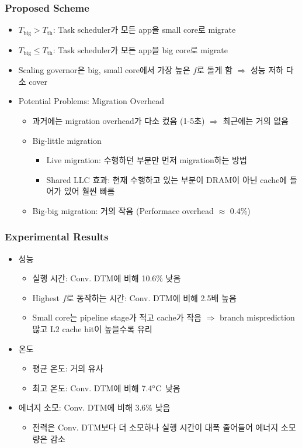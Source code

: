 \subsubsection*{Proposed Scheme}
\begin{itemize}
    \item $T_\mathrm{big}>T_\mathrm{th}$: Task scheduler가 모든 app을 small core로 migrate
    \item $T_\mathrm{big}\leq T_\mathrm{th}$: Task scheduler가 모든 app을 big core로 migrate
    \item Scaling governor은 big, small core에서 가장 높은 $f$로 돌게 함 $\Rightarrow$ 성능 저하 다소 cover
    \item Potential Problems: Migration Overhead
    \begin{itemize}
        \item 과거에는 migration overhead가 다소 컸음 (1-5초) $\Rightarrow$ 최근에는 거의 없음
        \item Big-little migration
        \begin{itemize}
            \item Live migration: 수행하던 부분만 먼저 migration하는 방법
            \item Shared LLC 효과: 현재 수행하고 있는 부분이 DRAM이 아닌 cache에 들어가 있어 훨씬 빠름
        \end{itemize}
        \item Big-big migration: 거의 작음 (Performace overhead $\approx$ 0.4\%)
    \end{itemize}
\end{itemize}

\subsubsection*{Experimental Results}
\begin{itemize}
    \item 성능
    \begin{itemize}
        \item 실행 시간: Conv. DTM에 비해 10.6\% 낮음
        \item Highest $f$로 동작하는 시간: Conv. DTM에 비해 2.5배 높음
        \item Small core는 pipeline stage가 적고 cache가 작음 $\Rightarrow$ branch misprediction 많고 L2 cache hit이 높을수록 유리
    \end{itemize}
    \newpage
    \item 온도
    \begin{itemize}
        \item 평균 온도: 거의 유사
        \item 최고 온도: Conv. DTM에 비해 7.4$^{\circ}\mathrm{C}$ 낮음
    \end{itemize}
    \item 에너지 소모: Conv. DTM에 비해 3.6\% 낮음
    \begin{itemize}
        \item 전력은 Conv. DTM보다 더 소모하나 실행 시간이 대폭 줄어들어 에너지 소모량은 감소
    \end{itemize}
\end{itemize}

